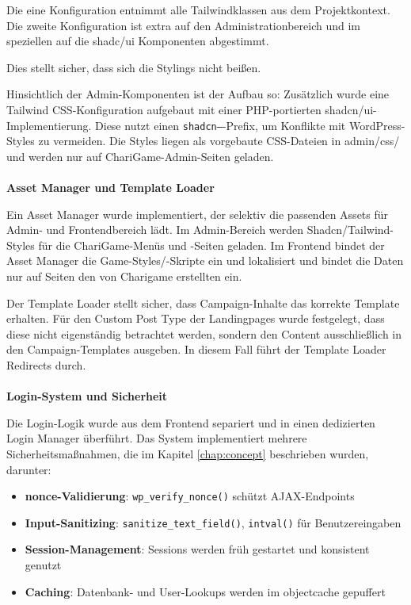 Die eine Konfiguration entnimmt alle Tailwindklassen aus dem Projektkontext.
Die zweite Konfiguration ist extra auf den Administrationbereich und im speziellen auf die shadc/ui Komponenten abgestimmt.

Dies stellt sicher, dass sich die Stylings nicht beißen.

Hinsichtlich der Admin-Komponenten ist der Aufbau so:
Zusätzlich wurde eine Tailwind CSS-Konfiguration aufgebaut mit einer PHP-portierten shadcn/ui-Implementierung.
Diese nutzt einen \texttt{shadcn--}-Prefix, um Konflikte mit WordPress-Styles zu vermeiden.
Die Styles liegen als vorgebaute CSS-Dateien in admin/css/ und werden nur auf ChariGame-Admin-Seiten geladen.
\\\\
\textbf{Asset Manager und Template Loader}

Ein Asset Manager wurde implementiert, der selektiv die passenden Assets für Admin- und Frontendbereich lädt.
Im Admin-Bereich werden Shadcn/Tailwind-Styles für die ChariGame-Menüs und -Seiten geladen.
Im Frontend bindet der Asset Manager die Game-Styles/-Skripte ein und lokalisiert und bindet die Daten nur auf Seiten den von Charigame erstellten ein.

Der Template Loader stellt sicher, dass Campaign-Inhalte das korrekte Template erhalten.
Für den Custom Post Type der Landingpages wurde festgelegt, dass diese nicht eigenständig betrachtet werden, sondern den Content ausschließlich in den Campaign-Templates ausgeben.
In diesem Fall führt der Template Loader Redirects durch.
\\\\
\textbf{Login-System und Sicherheit}

Die Login-Logik wurde aus dem Frontend separiert und in einen dedizierten Login Manager überführt.
Das System implementiert mehrere Sicherheitsmaßnahmen, die im Kapitel \ref{chap:concept} beschrieben wurden, darunter:

\begin{itemize}
    \item \textbf{\gls{nonce}-Validierung}: \texttt{wp\_verify\_nonce()} schützt AJAX-Endpoints
    \item \textbf{Input-Sanitizing}: \texttt{sanitize\_text\_field()}, \texttt{intval()} für Benutzereingaben
    \item \textbf{Session-Management}: Sessions werden früh gestartet und konsistent genutzt
    \item \textbf{Caching}: Datenbank- und User-Lookups werden im \gls{objectcache} gepuffert
\end{itemize}


